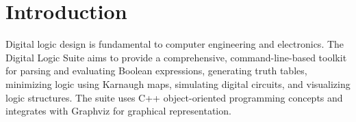 \section{Introduction}
Digital logic design is fundamental to computer engineering and electronics. The Digital Logic Suite aims to provide a comprehensive, command-line-based toolkit for parsing and evaluating Boolean expressions, generating truth tables, minimizing logic using Karnaugh maps, simulating digital circuits, and visualizing logic structures. The suite uses C++ object-oriented programming concepts and integrates with Graphviz for graphical representation.
